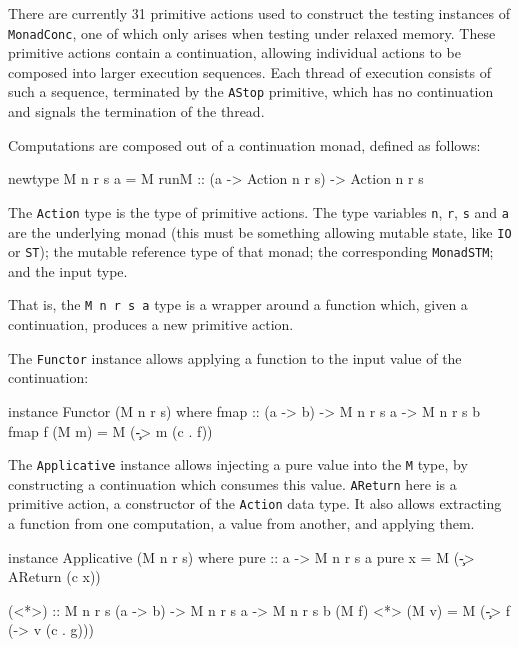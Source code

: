 There are currently 31 primitive actions used to construct the testing
instances of \verb|MonadConc|, one of which only arises when testing
under relaxed memory. These primitive actions contain a continuation,
allowing individual actions to be composed into larger execution
sequences. Each thread of execution consists of such a sequence,
terminated by the \verb|AStop| primitive, which has no continuation
and signals the termination of the thread.


Computations are composed out of a continuation monad, defined as
follows:

\begin{haskellcode}
newtype M n r s a = M
  { runM :: (a -> Action n r s) -> Action n r s }
\end{haskellcode}

The \verb|Action| type is the type of primitive actions. The type
variables \verb|n|, \verb|r|, \verb|s| and \verb|a| are the underlying
monad (this must be something allowing mutable state, like \verb|IO|
or \verb|ST|); the mutable reference type of that monad; the
corresponding \verb|MonadSTM|; and the input type.

That is, the \verb|M n r s a| type is a wrapper around a function
which, given a continuation, produces a new primitive action.

The \verb|Functor| instance allows applying a function to the input
value of the continuation:

\begin{haskellcode}
instance Functor (M n r s) where
  fmap :: (a -> b) -> M n r s a -> M n r s b
  fmap f (M m) = M (\c -> m (c . f))
\end{haskellcode}

The \verb|Applicative| instance allows injecting a pure value into the
\verb|M| type, by constructing a continuation which consumes this
value. \verb|AReturn| here is a primitive action, a constructor of the
\verb|Action| data type. It also allows extracting a function from one
computation, a value from another, and applying them.

\begin{haskellcode}
instance Applicative (M n r s) where
  pure :: a -> M n r s a
  pure x = M (\c -> AReturn (c x))

  (<*>) :: M n r s (a -> b) -> M n r s a -> M n r s b
  (M f) <*> (M v) = M (\c -> f (\g -> v (c . g)))
\end{haskellcode}

